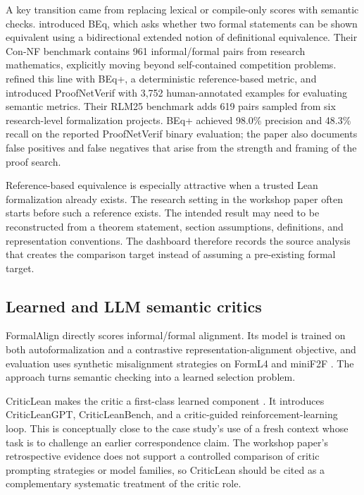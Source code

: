 \documentclass[11pt]{article}
\begin{document}
A key transition came from replacing lexical or compile-only scores with
semantic checks.  \citet{liu2025beq} introduced BEq, which asks whether two
formal statements can be shown equivalent using a bidirectional extended
notion of definitional equivalence.  Their Con-NF benchmark contains 961
informal/formal pairs from research mathematics, explicitly moving beyond
self-contained competition problems.  \citet{poiroux2025reliable} refined this
line with BEq+, a deterministic reference-based metric, and introduced
ProofNetVerif with 3,752 human-annotated examples for evaluating semantic
metrics.  Their RLM25 benchmark adds 619 pairs sampled from six research-level
formalization projects.  BEq+ achieved 98.0\% precision and 48.3\% recall on the
reported ProofNetVerif binary evaluation; the paper also documents false
positives and false negatives that arise from the strength and framing of the
proof search.

Reference-based equivalence is especially attractive when a trusted Lean
formalization already exists.  The research setting in the workshop paper often
starts before such a reference exists.  The intended result may need to be
reconstructed from a theorem statement, section assumptions, definitions, and
representation conventions.  The dashboard therefore records the source
analysis that creates the comparison target instead of assuming a pre-existing
formal target.

\subsection{Learned and LLM semantic critics}

FormalAlign directly scores informal/formal alignment.  Its model is trained on
both autoformalization and a contrastive representation-alignment objective,
and evaluation uses synthetic misalignment strategies on FormL4 and miniF2F
\citep{lu2025formalalign}.  The approach turns semantic checking into a learned
selection problem.

CriticLean makes the critic a first-class learned component
\citep{peng2025criticlean}.  It introduces CriticLeanGPT, CriticLeanBench, and a
critic-guided reinforcement-learning loop.  This is conceptually close to the
case study's use of a fresh context whose task is to challenge an earlier
correspondence claim.  The workshop paper's retrospective evidence does not
support a controlled comparison of critic prompting strategies or model
families, so CriticLean should be cited as a complementary systematic treatment
of the critic role.
\end{document}
